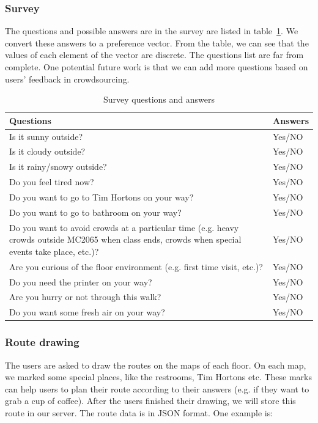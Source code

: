 \documentclass{sigchi}
\begin{document}
\subsubsection{Survey}

The questions and possible answers are in the survey are listed in table~\ref{table:survey_questions}. We convert these answers to a preference vector. From the table, we can see that the values of each element of the vector are discrete. The questions list are far from complete. One potential future work is that we can add more questions based on users’ feedback in crowdsourcing.
\begin{table}
  \centering
  \caption{Survey questions and answers}
  \label{table:survey_questions}
  \begin{tabularx}{0.5\textwidth}{|X|l|}
    \hline \hline
    Questions & Answers \\\hline
    Is it sunny outside? & Yes/NO \\\hline
    Is it cloudy outside? & Yes/NO \\\hline
    Is it rainy/snowy outside? & Yes/NO \\\hline
    Do you feel tired now? & Yes/NO \\\hline
    Do you want to go to Tim Hortons on your way? & Yes/NO \\\hline
    Do you want to go to bathroom on your way? & Yes/NO \\\hline
    Do you want to avoid crowds at a particular time (e.g. heavy crowds outside MC2065 when class ends, crowds when special events take place, etc.)? & Yes/NO \\\hline
    Are you curious of the floor environment (e.g. first time visit, etc.)? & Yes/NO \\\hline
    Do you need the printer on your way? & Yes/NO \\\hline
    Are you hurry or not through this walk? & Yes/NO \\\hline
    Do you want some fresh air on your way? & Yes/NO \\\hline
    \hline
  \end{tabularx}
\end{table}

\subsubsection{Route drawing}

The users are asked to draw the routes on the maps of each floor. On each map, we marked some special places, like the restrooms, Tim Hortons etc. These marks can help users to plan their route according to their answers (e.g. if they want to grab a cup of coffee). After the users finished their drawing, we will store this route in our server. The route data is in JSON format. One example is:
\end{document}
